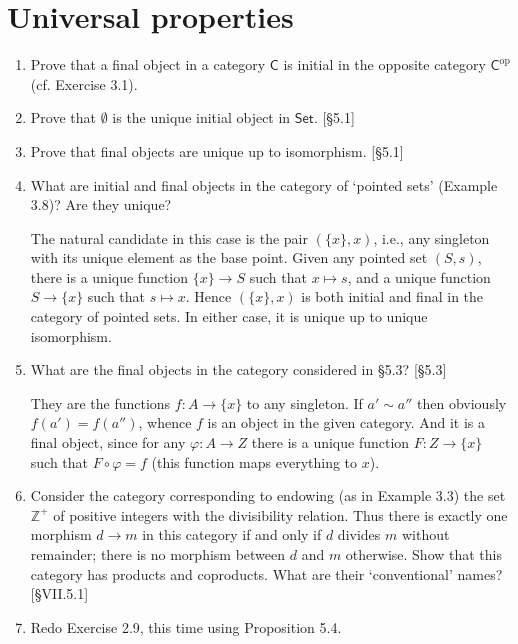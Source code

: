 \section{Universal properties}
\begin{enumerate}
      \item Prove that a final object in a category $\mathsf{C}$ is initial in the opposite category $\mathsf{C}^{\text{op}}$ (cf. Exercise 3.1).
      \item Prove that $\emptyset$ is the unique initial object in $\mathsf{Set}$. [\S5.1]
      \item Prove that final objects are unique up to isomorphism. [\S5.1]
      \item What are initial and final objects in the category of `pointed sets' (Example 3.8)? Are they unique?
            \begin{solution}
                  The natural candidate in this case is the pair $(\{x\}, x)$, i.e., any singleton with its unique element as the base point. Given any pointed set $(S, s)$, there is a unique function $\{x\} \to S$ such that $x \mapsto s$, and a unique function $S \to \{x\}$ such that $s \mapsto x$. Hence $(\{x\}, x)$ is both initial and final in the category of pointed sets. In either case, it is unique up to unique isomorphism.
            \end{solution}
      \item What are the final objects in the category considered in \S5.3? [\S5.3]
            \begin{solution}
                  They are the functions $f:A \to \{x\}$ to any singleton. If $a'\sim a''$ then obviously $f(a') = f(a'')$, whence $f$ is an object in the given category. And it is a final object, since for any $\varphi:A \to Z$ there is a unique function $F: Z \to \{x\}$ such that $F\circ \varphi = f$ (this function maps everything to $x$).
            \end{solution}
      \item Consider the category corresponding to endowing (as in Example 3.3) the set $\mathbb{Z}^+$ of positive integers with the divisibility relation. Thus there is exactly one morphism $d \to m$ in this category if and only if $d$ divides $m$ without remainder; there is no morphism between $d$ and $m$ otherwise. Show that this category has products and coproducts. What are their `conventional' names? [\S VII.5.1]
      \item Redo Exercise 2.9, this time using Proposition 5.4.
            \begin{solution}

\end{solution}
\end{enumerate}
